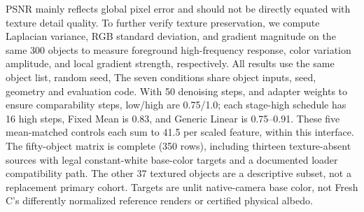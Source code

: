 \documentclass[times,twocolumn,final]{elsarticle}
\providecommand{\DIFadd}[1]{{\protect\color{blue} \sf #1}} %
\providecommand{\DIFdel}[1]{{\protect\color{red} \scriptsize #1}} %
\providecommand{\DIFaddbegin}{} %
\providecommand{\DIFaddend}{} %
\providecommand{\DIFdelbegin}{} %
\providecommand{\DIFdelend}{} %
\begin{document}
\DIFdelbegin \DIFdel{PSNR mainly reflects global pixel error and should not be directly equated with texture detail quality. To further verify texture preservation, we compute Laplacian variance, RGB standard deviation, and gradient magnitude on the same 300 objects to measure foreground high-frequency response, color variation amplitude, and local gradient strength, respectively. All results use the same object list, random seed, }\DIFdelend \DIFaddbegin \DIFadd{The seven conditions share object inputs, seed, geometry and evaluation code. With }\DIFaddend 50 \DIFdelbegin \DIFdel{denoising steps, and adapter weights to ensure comparability}\DIFdelend \DIFaddbegin \DIFadd{steps, low/high are 0.75/1.0; each stage-high schedule has 16 high steps, Fixed Mean is 0.83, and Generic Linear is 0.75--0.91. These five mean-matched controls each sum to 41.5 per scaled feature, within this interface. The fifty-object matrix is complete (350 rows), including thirteen texture-absent sources with legal constant-white base-color targets and a documented loader compatibility path. The other 37 textured objects are a descriptive subset, not a replacement primary cohort. Targets are unlit native-camera base color, not Fresh C's differently normalized reference renders or certified physical albedo}\DIFaddend .
\end{document}
